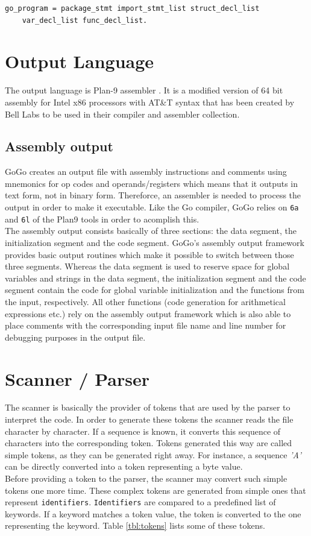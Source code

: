 \documentclass[a4paper]{scrartcl}
\let\chapter\section
\let\section\subsection
\let\subsection\subsubsection
\let\subsubsection\paragraph
\let\paragraph\subparagraph
\let\subparagraph\undefined
\begin{document}
        \begin{lstlisting}[caption=GoGo Program]
go_program = package_stmt import_stmt_list struct_decl_list 
    var_decl_list func_decl_list.
        \end{lstlisting}


  \chapter{Output Language}
    The output language is Plan-9 assembler \cite{pik00}. It is a modified version of 64 bit assembly for Intel x86 processors with AT\&T syntax that has been created by Bell Labs to be used in their compiler and assembler collection.
    
    \section{Assembly output}
      GoGo creates an output file with assembly instructions and comments using mnemonics for op codes and operands/registers which means that it outputs in text form, not in binary form. Thereforce, an assembler is needed to process the output in order to make it executable. Like the Go compiler, GoGo relies on \texttt{6a} and \texttt{6l} of the Plan9 tools in order to acomplish this\cite{pik00}.\\
      The assembly output consists basically of three sections: the data segment, the initialization segment and the code segment. GoGo's assembly output framework provides basic output routines which make it possible to switch between those three segments. Whereas the data segment is used to reserve space for global variables and strings in the data segment, the initialization segment and the code segment contain the code for global variable initialization and the functions from the input, respectively. All other functions (code generation for arithmetical expressions etc.) rely on the assembly output framework which is also able to place comments with the corresponding input file name and line number for debugging purposes in the output file.

  \chapter{Scanner / Parser}
    The scanner is basically the provider of tokens that are used by the parser
    to interpret the code. In order to generate these tokens the scanner reads
    the file character by character. If a sequence is known, it converts this 
    sequence of characters into the corresponding token. Tokens generated this
    way are called simple tokens, as they can be generated right away. For 
    instance, a sequence \textit{'A'} can be directly converted into a token 
    representing a byte value. \\
    Before providing a token to the parser, the scanner may convert such 
    simple tokens one more time. These complex tokens are generated from simple
    ones that represent \texttt{identifiers}. \texttt{Identifiers} are compared to a 
    predefined list of keywords. If a keyword matches a token value, the token
    is converted to the one representing the keyword. Table \ref{tbl:tokens} 
    lists some of these tokens.
\end{document}
